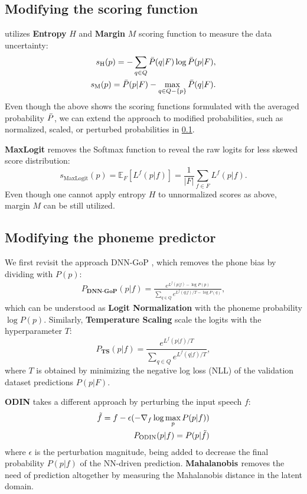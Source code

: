\subsection{Modifying the scoring function}\label{subsec:modify_score}
\cite{kye2022tidal} utilizes \textbf{Entropy} $H$ and \textbf{Margin} $M$ scoring function to measure the data uncertainty:
\begin{align}
    s_\text{H}(p) = -\sum_{q \in Q} \Bar{P}(q|F) \log \Bar{P}(p|F), \\
    s_\text{M}(p) = \Bar{P}(p|F) - \max_{q \in Q - \{p\}} \Bar{P}(q|F).
\end{align}
Even though the above shows the scoring functions formulated with the averaged probability $\Bar{P}$, we can extend the approach to modified probabilities, such as normalized, scaled, or perturbed probabilities in \cref{subsec:modify_score}.


\textbf{MaxLogit} \cite{hendrycks2022scaling} removes the Softmax function to reveal the raw logits for less skewed score distribution:
\begin{equation}
    s_\text{MaxLogit}(p) = \mathbb{E}_F[L^f(p|f)] = \frac{1}{|F|} \sum_{f \in F} L^f(p|f).
\end{equation}
Even though one cannot apply entropy $H$ to unnormalized scores as above, margin $M$ can be still utilized.


\subsection{Modifying the phoneme predictor}\label{subsec:modify_pred}
We first revisit the approach DNN-GoP \cite{hu2015improved}, which removes the phone bias by dividing with $P(p)$:
\begin{align}
    P_\textbf{DNN-GoP}(p|f) = \frac{e^{L^f(p|f) - \log P(p)}}{ \sum_{q \in Q} e^{L^f(q|f) / T - \log P(q)}},
\end{align}
which can be understood as \textbf{Logit Normalization} with the phoneme probability $\log P(p)$.
Similarly, \textbf{Temperature Scaling} \cite{guo2017calibration} scale the logits with the hyperparameter $T$:
\begin{equation}
    P_\textbf{TS}(p|f) = \frac{e^{L^f(p|f) / T}}{ \sum_{q \in Q} e^{L^f(q|f) / T}},
\end{equation}
where $T$ is obtained by minimizing the negative log loss (NLL) of the validation dataset predictions $P(p|F)$.


\textbf{ODIN} \cite{liang2018enhancing} takes a different approach by perturbing the input speech $f$:
\begin{align}
    \Tilde{f} = f - \epsilon (- \nabla_f \log \max_p P(p|f))\\
    P_\text{ODIN}(p|f) = P(p|\Tilde{f})
\end{align}
where $\epsilon$ is the perturbation magnitude, being added to decrease the final probability $P(p|f)$ of the NN-driven prediction.
\textbf{Mahalanobis \cite{lee2018simple}} removes the need of prediction altogether by measuring the Mahalanobis distance in the latent domain.
